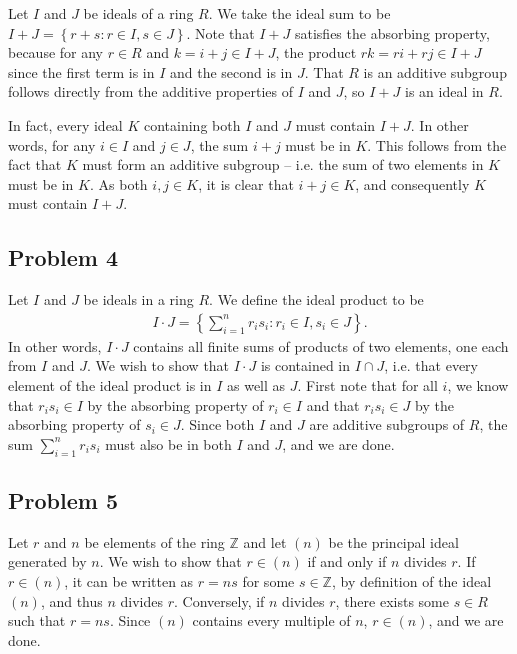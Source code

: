 \documentclass{../../mathnotes}
\begin{document}
Let $I$ and $J$ be ideals of a ring $R$. We take the ideal sum to be $I+J=\left\{ r+s:r\in I,s\in J \right\}$.
Note that $I+J$ satisfies the absorbing property, because for any $r\in R$ and $k=i+j\in I+J$, the product
$rk=ri+rj\in I+J$ since the first term is in $I$ and the second is in $J$. That $R$ is an additive subgroup follows
directly from the additive properties of $I$ and $J$, so $I+J$ is an ideal in $R$.

In fact, every ideal $K$ containing both $I$ and $J$ must contain $I+J$. In other words, for any $i\in I$ and $j\in J$,
the sum $i+j$ must be in $K$. This follows from the fact that $K$ must form an additive subgroup -- i.e. the sum of
two elements in $K$ must be in $K$. As both $i,j\in K$, it is clear that $i+j\in K$, and consequently $K$ must contain
$I+J$.

\subsection*{Problem 4}

Let $I$ and $J$ be ideals in a ring $R$. We define the ideal product to be
\begin{align*}
    I\cdot J=\left\{ \sum_{i=1}^n r_is_i:r_i\in I,s_i\in J \right\}.
\end{align*}
In other words, $I\cdot J$ contains all finite sums of products of two elements, one each from $I$ and $J$. We wish
to show that $I\cdot J$ is contained in $I\cap J$, i.e. that every element of the ideal product is in $I$ as well as
$J$. First note that for all $i$, we know that $r_is_i\in I$ by the absorbing property of $r_i\in I$ and that $r_is_i\in J$
by the absorbing property of $s_i\in J$. Since both $I$ and $J$ are additive subgroups of $R$, the sum $\sum_{i=1}^nr_is_i$
must also be in both $I$ and $J$, and we are done.

\subsection*{Problem 5}

Let $r$ and $n$ be elements of the ring $\mathbb{Z}$ and let $(n)$ be the principal ideal generated by $n$. We wish to
show that $r\in(n)$ if and only if $n$ divides $r$. If $r\in (n)$, it can be written as $r=ns$ for some $s\in\mathbb{Z}$,
by definition of the ideal $(n)$, and thus $n$ divides $r$.
Conversely, if $n$ divides $r$, there exists some $s\in R$ such that $r=ns$. Since $(n)$ contains every multiple of $n$,
$r\in(n)$, and we are done.
\end{document}
